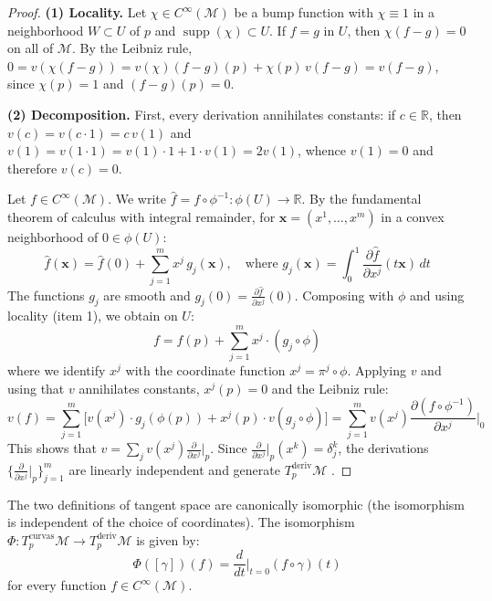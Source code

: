 \begin{proof}
\textbf{(1) Locality.} Let $\chi \in C^\infty(\mathcal{M})$ be a bump function with $\chi \equiv 1$ in a neighborhood $W \subset U$ of $p$ and $\operatorname{supp}(\chi) \subset U$. If $f = g$ in $U$, then $\chi(f - g) = 0$ on all of $\mathcal{M}$. By the Leibniz rule, $0 = v(\chi(f-g)) = v(\chi)(f-g)(p) + \chi(p) \, v(f-g) = v(f-g)$, since $\chi(p) = 1$ and $(f-g)(p) = 0$.

\textbf{(2) Decomposition.} First, every derivation annihilates constants: if $c \in \mathbb{R}$, then $v(c) = v(c \cdot 1) = c \, v(1)$ and $v(1) = v(1 \cdot 1) = v(1) \cdot 1 + 1 \cdot v(1) = 2v(1)$, whence $v(1) = 0$ and therefore $v(c) = 0$.

Let $f \in C^\infty(\mathcal{M})$. We write $\hat{f} = f \circ \phi^{-1}: \phi(U) \to \mathbb{R}$. By the fundamental theorem of calculus with integral remainder, for $\mathbf{x} = (x^1, \ldots, x^m)$ in a convex neighborhood of $0 \in \phi(U)$:
\[
\hat{f}(\mathbf{x}) = \hat{f}(0) + \sum_{j=1}^{m} x^j \, g_j(\mathbf{x}), \quad \text{where } g_j(\mathbf{x}) = \int_0^1 \frac{\partial \hat{f}}{\partial x^j}(t\mathbf{x}) \, dt
\]
The functions $g_j$ are smooth and $g_j(0) = \frac{\partial \hat{f}}{\partial x^j}(0)$. Composing with $\phi$ and using locality (item 1), we obtain on $U$:
\[
f = f(p) + \sum_{j=1}^{m} x^j \cdot (g_j \circ \phi)
\]
where we identify $x^j$ with the coordinate function $x^j = \pi^j \circ \phi$. Applying $v$ and using that $v$ annihilates constants, $x^j(p) = 0$ and the Leibniz rule:
\[
v(f) = \sum_{j=1}^{m} \bigl[v(x^j) \cdot g_j(\phi(p)) + x^j(p) \cdot v(g_j \circ \phi)\bigr] = \sum_{j=1}^{m} v(x^j) \frac{\partial(f \circ \phi^{-1})}{\partial x^j}\bigg|_{0}
\]
This shows that $v = \sum_j v(x^j) \frac{\partial}{\partial x^j}\big|_p$. Since $\frac{\partial}{\partial x^j}\big|_p(x^k) = \delta_j^k$, the derivations $\{\frac{\partial}{\partial x^j}\big|_p\}_{j=1}^m$ are linearly independent and generate $T_p^{\text{deriv}}\mathcal{M}$ \citep[Proposition 3.2]{lee2012introduction}.
\end{proof}

\begin{proposition}\label{prop:equivalencia_espacio_tangente}
The two definitions of tangent space are canonically isomorphic (the isomorphism is independent of the choice of coordinates). The isomorphism $\Phi: T_p^{\text{curvas}}\mathcal{M} \to T_p^{\text{deriv}}\mathcal{M}$ is given by:
\[
\Phi([\gamma])(f) = \frac{d}{dt}\bigg|_{t=0} (f \circ \gamma)(t)
\]
for every function $f \in C^\infty(\mathcal{M})$.
\end{proposition}

